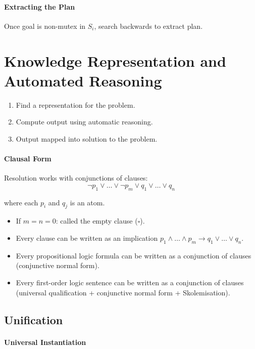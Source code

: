 \documentclass[twocolumn,english]{article}
\begin{document}
\paragraph{Extracting the Plan}

Once goal is non-mutex in $S_{i}$, search backwards to extract plan.

\section{Knowledge Representation and Automated Reasoning}
\begin{enumerate}
\item Find a representation for the problem.
\item Compute output using automatic reasoning.
\item Output mapped into solution to the problem.
\end{enumerate}

\paragraph{Clausal Form}

Resolution works with conjunctions of clauses:
\[
\lnot p_{1}\lor\dots\lor\lnot p_{m}\lor q_{1}\lor\dots\lor q_{n}
\]

where each $p_{i}$ and $q_{j}$ is an atom.
\begin{itemize}
\item If $m=n=0$: called the empty clause ($\square$).
\item Every clause can be written as an implication $p_{1}\land\dots\land p_{m}\rightarrow q_{1}\lor\dots\lor q_{n}$.
\item Every propositional logic formula can be written as a conjunction
of clauses (conjunctive normal form).
\item Every first-order logic sentence can be written as a conjunction of
clauses (universal qualification + conjunctive normal form + Skolemisation).
\end{itemize}

\subsection{Unification}

\paragraph{Universal Instantiation}
\end{document}
